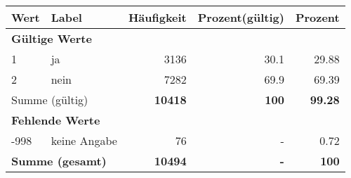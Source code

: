     \begin{longtable}{lXrrr}
     \toprule
     \textbf{Wert} & \textbf{Label} & \textbf{Häufigkeit} & \textbf{Prozent(gültig)} & \textbf{Prozent} \\
     \endhead
     \midrule
     \multicolumn{5}{l}{\textbf{Gültige Werte}}\\

     1 &
     \multicolumn{1}{X}{ ja   } &


       \num{3136} &
       \num[round-mode=places,round-precision=2]{30.1} &
         \num[round-mode=places,round-precision=2]{29.88} \\

     2 &
     \multicolumn{1}{X}{ nein   } &


       \num{7282} &
       \num[round-mode=places,round-precision=2]{69.9} &
         \num[round-mode=places,round-precision=2]{69.39} \\
     \midrule
     \multicolumn{2}{l}{Summe (gültig)} &
       \textbf{\num{10418}} &
     \textbf{\num{100}} &
       \textbf{\num[round-mode=places,round-precision=2]{99.28}} \\
     \multicolumn{5}{l}{\textbf{Fehlende Werte}}\\
       -998 &
       keine Angabe &
         \num{76} &
        - &
         \num[round-mode=places,round-precision=2]{0.72} \\
     \midrule
     \multicolumn{2}{l}{\textbf{Summe (gesamt)}} &
          \textbf{\num{10494}} &
        \textbf{-} &
        \textbf{\num{100}} \\
     \bottomrule
     \end{longtable}
     
